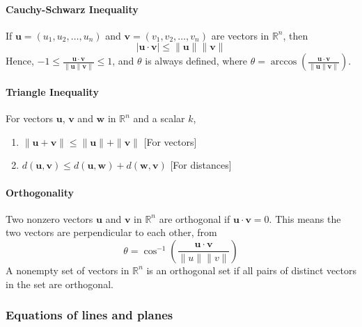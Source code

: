 \documentclass[../linear-algebra.tex]{subfiles}
\begin{document}
\paragraph{Cauchy-Schwarz Inequality}
If $\mathbf{u} = (u_1, u_2, \ldots, u_n)$ and $\mathbf{v} = (v_1, v_2, \ldots, v_n)$
are vectors in $\mathbb{R}^n$, then
\[|\mathbf{u}\cdot\mathbf{v}| \leq \|\mathbf{u}\|\|\mathbf{v}\|\]
Hence, $-1 \leq \frac{\mathbf{u}\cdot\mathbf{v}}{\|\mathbf{u}\|\mathbf{v}\|} \leq 1$,
and $\theta$ is always defined,
where $\theta = \arccos(\frac{\mathbf{u}\cdot\mathbf{v}}{\|\mathbf{u}\|\mathbf{v}\|})$.

\paragraph{Triangle Inequality}
For vectors $\mathbf{u}$, $\mathbf{v}$ and $\mathbf{w}$ in $\mathbb{R}^n$ and a scalar $k$,
\begin{enumerate}
    \item $\|\mathbf{u} + \mathbf{v}\| \leq \|\mathbf{u}\| + \|\mathbf{v}\|$ [For vectors]
    \item $d(\mathbf{u}, \mathbf{v}) \leq d(\mathbf{u}, \mathbf{w}) + d(\mathbf{w}, \mathbf{v})$ [For distances]
\end{enumerate}

\paragraph{Orthogonality}
Two nonzero vectors $\mathbf{u}$ and $\mathbf{v}$ in $\mathbb{R}^n$
are orthogonal if $\mathbf{u}\cdot\mathbf{v} = 0$.
This means the two vectors are perpendicular to each other, from
\[\theta = \cos^{-1}\left(\frac{\mathbf{u}\cdot\mathbf{v}}{\|u\|\|v\|}\right)\]
A nonempty set of vectors in $\mathbb{R}^n$ is an orthogonal set if all
pairs of distinct vectors in the set are orthogonal.

\subsubsection*{Equations of lines and planes}
\end{document}
